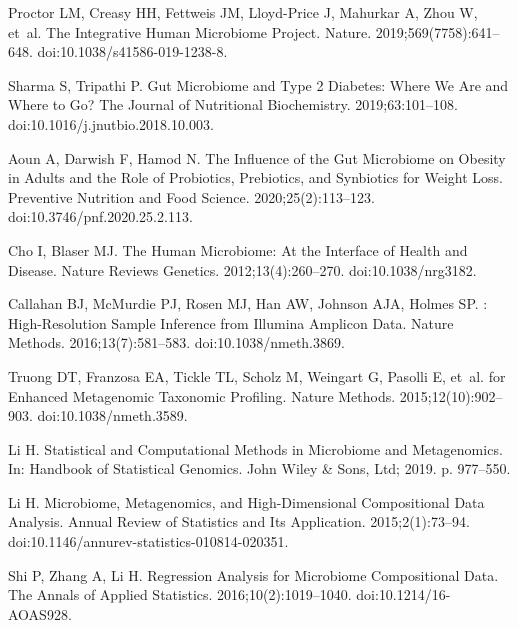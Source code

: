 \documentclass[10pt,letterpaper]{article}
\begin{document}
\begin{thebibliography}{10}

Proctor LM, Creasy HH, Fettweis JM, {Lloyd-Price} J, Mahurkar A, Zhou W, et~al.
\newblock The {{Integrative Human Microbiome Project}}.
\newblock Nature. 2019;569(7758):641--648.
\newblock doi:{10.1038/s41586-019-1238-8}.

Sharma S, Tripathi P.
\newblock Gut Microbiome and Type 2 Diabetes: Where We Are and Where to Go?
\newblock The Journal of Nutritional Biochemistry. 2019;63:101--108.
\newblock doi:{10.1016/j.jnutbio.2018.10.003}.

Aoun A, Darwish F, Hamod N.
\newblock The {{Influence}} of the {{Gut Microbiome}} on {{Obesity}} in
  {{Adults}} and the {{Role}} of {{Probiotics}}, {{Prebiotics}}, and
  {{Synbiotics}} for {{Weight Loss}}.
\newblock Preventive Nutrition and Food Science. 2020;25(2):113--123.
\newblock doi:{10.3746/pnf.2020.25.2.113}.

Cho I, Blaser MJ.
\newblock The Human Microbiome: At the Interface of Health and Disease.
\newblock Nature Reviews Genetics. 2012;13(4):260--270.
\newblock doi:{10.1038/nrg3182}.

Callahan BJ, McMurdie PJ, Rosen MJ, Han AW, Johnson AJA, Holmes SP.
: {{High}}-Resolution Sample Inference from {{Illumina}}
  Amplicon Data.
\newblock Nature Methods. 2016;13(7):581--583.
\newblock doi:{10.1038/nmeth.3869}.

Truong DT, Franzosa EA, Tickle TL, Scholz M, Weingart G, Pasolli E, et~al.
 for Enhanced Metagenomic Taxonomic Profiling.
\newblock Nature Methods. 2015;12(10):902--903.
\newblock doi:{10.1038/nmeth.3589}.

Li H.
\newblock Statistical and {{Computational Methods}} in {{Microbiome}} and
  {{Metagenomics}}.
\newblock In: Handbook of {{Statistical Genomics}}. {John Wiley \& Sons, Ltd};
  2019. p. 977--550.

Li H.
\newblock Microbiome, {{Metagenomics}}, and {{High}}-{{Dimensional
  Compositional Data Analysis}}.
\newblock Annual Review of Statistics and Its Application. 2015;2(1):73--94.
\newblock doi:{10.1146/annurev-statistics-010814-020351}.

Shi P, Zhang A, Li H.
\newblock Regression Analysis for Microbiome Compositional Data.
\newblock The Annals of Applied Statistics. 2016;10(2):1019--1040.
\newblock doi:{10.1214/16-AOAS928}.


\end{thebibliography}
\end{document}
